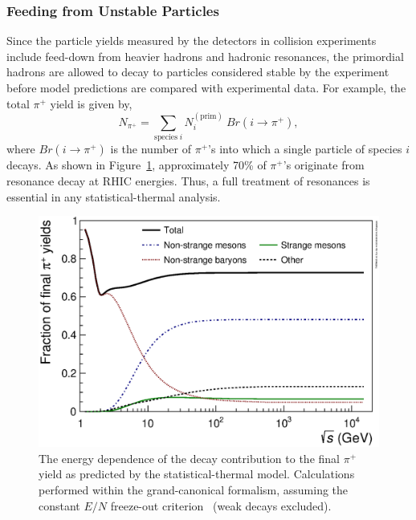 \documentclass{elsarticle}
\begin{document}
\subsubsection{Feeding from Unstable Particles}

Since the particle yields measured by the detectors in collision experiments include 
feed-down from heavier hadrons and hadronic resonances, the primordial
hadrons are allowed to decay to particles considered stable by the
experiment before model predictions are compared with experimental
data. For example, the total $\pi^+$ yield is given by,
\begin{equation}
N_{\pi^+} = \sum_{\mathrm{species}\;i}N_i^{(\mathrm{prim})}\:Br(i\rightarrow \pi^+), 
\end{equation}
where $Br(i\rightarrow \pi^+)$ is the number of $\pi^+$'s into which a single 
particle of species $i$ decays. As shown in Figure~\ref{PiDecay}, approximately 
70\% of $\pi^+$'s originate from resonance decay at RHIC energies. Thus, a full 
treatment of resonances is essential in any statistical-thermal analysis.\\


 
\begin{figure}
\begin{center}
\includegraphics[width=12cm]{fig1_EnergyDepPiDecay_Thermus_v4.eps}
\end{center}
\caption{The energy dependence of the decay contribution to the final $\pi^+$ yield as predicted by the 
statistical-thermal model. Calculations performed within the grand-canonical formalism, 
assuming the constant $E/N$ freeze-out criterion~\cite{Cleymans:1998fq,Cleymans:1999st} (weak decays excluded).}\label{PiDecay}
\end{figure}
\end{document}
